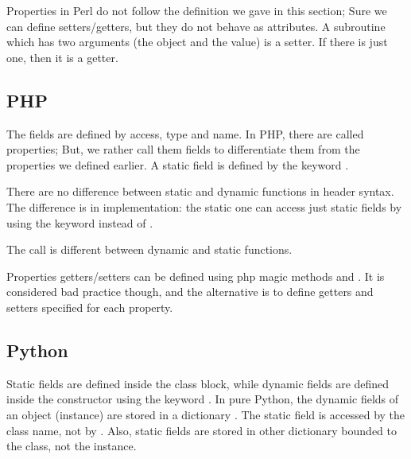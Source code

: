 \documentclass{KodeBook}
\begin{document}


Properties in Perl do not follow the definition we gave in this section; 
Sure we can define setters/getters, but they do not behave as attributes. 
A subroutine which has two arguments (the object and the value) is a setter.
If there is just one, then it is a getter. 



\subsection{PHP}

The fields are defined by access, type and name.
In PHP, there are called properties; But, we rather call them fields to differentiate them from the properties we defined earlier.
A static field is defined by the keyword .



There are no difference between static and dynamic functions in header syntax. 
The difference is in implementation: the static one can access just static fields by using the keyword  instead of .



The call is different between dynamic and static functions.



Properties getters/setters can be defined using php magic methods  and .
It is considered bad practice though, and the alternative is to define getters and setters specified for each property.



\subsection{Python}

Static fields are defined inside the class block, while dynamic fields are defined inside the constructor using the keyword . 
In pure Python, the dynamic fields of an object (instance) are stored in a dictionary .
The static field is accessed by the class name, not by .
Also, static fields are stored in other dictionary bounded to the class, not the instance.
\end{document}
